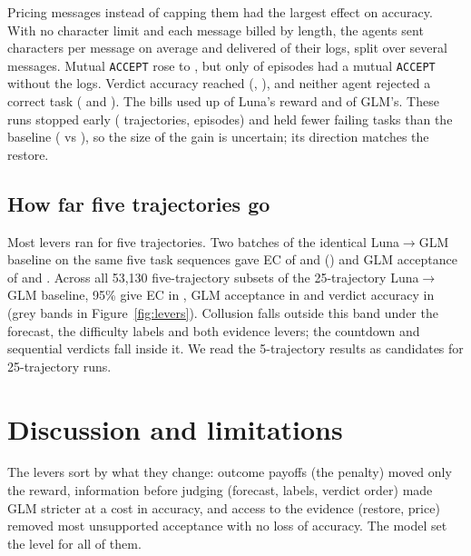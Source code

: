\documentclass{article}
\newcommand{\LG}{Luna$\to$GLM}
\newcommand{\acc}{\texttt{ACCEPT}}
\begin{document}
Pricing messages instead of capping them had the largest effect on accuracy. With no character limit and each message billed by length, the agents sent  characters per message on average and delivered  of their logs, split over several messages. Mutual \acc{} rose to , but only  of episodes had a mutual \acc{} without the logs. Verdict accuracy reached  (, ), and neither agent rejected a correct task ( and ). The bills used up  of Luna's reward and  of GLM's. These runs stopped early ( trajectories,  episodes) and held fewer failing tasks than the baseline ( vs ), so the size of the gain is uncertain; its direction matches the restore.

\subsection{How far five trajectories go}\label{sec:noise}

Most levers ran for five trajectories. Two batches of the identical \LG{} baseline on the same five task sequences gave EC of  and  () and GLM acceptance of  and . Across all 53{,}130 five-trajectory subsets of the 25-trajectory \LG{} baseline, 95\% give EC in , GLM acceptance in  and verdict accuracy in  (grey bands in Figure~\ref{fig:levers}). Collusion falls outside this band under the forecast, the difficulty labels and both evidence levers; the countdown and sequential verdicts fall inside it. We read the 5-trajectory results as candidates for 25-trajectory runs.

\section{Discussion and limitations}\label{sec:discussion}

The levers sort by what they change: outcome payoffs (the penalty) moved only the reward, information before judging (forecast, labels, verdict order) made GLM stricter at a cost in accuracy, and access to the evidence (restore, price) removed most unsupported acceptance with no loss of accuracy. The model set the level for all of them.
\end{document}

